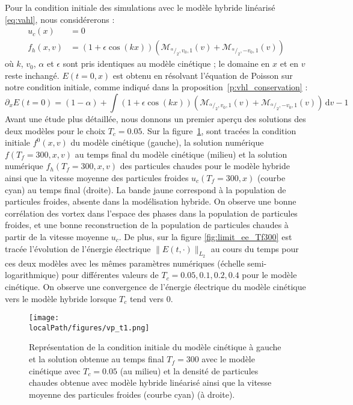 Pour la condition initiale des simulations avec le modèle hybride linéarisé \eqref{eq:vahl}, nous considérerons :
\begin{equation}
  \begin{aligned}
    u_c(x)   & = 0 \\
    f_h(x,v) & = (1+\epsilon\cos(kx))\left( \mathcal{M}_{^\alpha/_2,v_0,1}(v) + \mathcal{M}_{^\alpha/_2,-v_0,1}(v) \right)
  \end{aligned}
\label{eq:HL:init}
\end{equation}
où $k$, $v_0$, $\alpha$ et $\epsilon$ sont pris identiques au modèle cinétique ; le domaine en $x$ et en $v$ reste inchangé. $E(t=0,x)$ est obtenu en résolvant l'équation de Poisson sur notre condition initiale, comme indiqué dans la proposition~\ref{p:vhl_conservation} :
$$
  \partial_x E(t=0) = (1-\alpha) + \int (1+\epsilon\cos(kx))\left( \mathcal{M}_{^\alpha/_2,v_0,1}(v) + \mathcal{M}_{^\alpha/_2,-v_0,1}(v) \right)\,\mathrm{d}v - 1
$$
Avant une étude plus détaillée, nous donnons un premier aperçu des solutions des deux modèles pour le choix $T_c=0.05$. Sur la figure~\ref{fig:limit_vp}, sont tracées la condition initiale $f^0(x, v)$ du modèle cinétique (gauche), la solution numérique  $f(T_f=300, x, v)$ au temps final du modèle cinétique (milieu) et la solution numérique $f_h(T_f=300, x, v)$ des particules chaudes pour le modèle hybride ainsi que la vitesse moyenne des particules froides $u_c(T_f=300,x)$ (courbe cyan) au temps final (droite). La bande jaune correspond à la population de particules froides, absente dans la modélisation hybride. On observe une bonne corrélation des vortex dans l'espace des phases dans la population de particules froides, et une bonne reconstruction de la population de particules chaudes à partir de la vitesse moyenne $u_c$. De plus, sur la figure \ref{fig:limit_ee_Tf300} est tracée l'évolution de l'énergie électrique $\|E(t, \cdot)\|_{L_2}$ au cours du temps pour ces deux modèles avec les mêmes paramètres numériques (échelle semi-logarithmique) pour différentes valeurs de $T_c=0.05,0.1,0.2,0.4$ pour le modèle cinétique. On observe une convergence de l'énergie électrique du modèle cinétique vers le modèle hybride lorsque $T_c$ tend vers $0$.
\begin{figure}[h]
  \centering
  \texttt{[image: \\localPath/figures/vp\_t1.png]}
  \caption{Représentation de la condition initiale du modèle cinétique à gauche et la solution obtenue au temps final $T_f=300$ avec le modèle cinétique avec $T_c = 0.05$ (au milieu) et la densité de particules chaudes obtenue avec modèle hybride linéarisé ainsi que la vitesse moyenne des particules froides (courbe cyan) (à droite).}
  \label{fig:limit_vp}
\end{figure}
